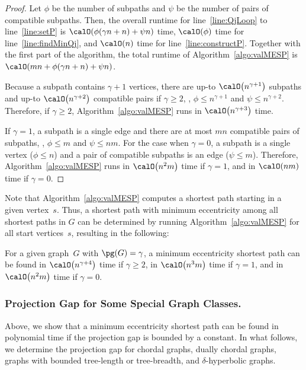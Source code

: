 \begin{proof}
Let $\phi$ be the number of subpaths and $\psi$ be the number of pairs of compatible subpaths.
Then, the overall runtime for line~\ref{line:QjLoop} to line~\ref{line:setP} is $\calO(\phi (\gamma n + n) + \psi n)$ time, $\calO(\phi)$ time for line~\ref{line:findMinQj}, and $\calO(n)$ time for line~\ref{line:constructP}.
Together with the first part of the algorithm, the total runtime of Algorithm~\ref{algo:valMESP} is $\calO(mn + \phi (\gamma n + n) + \psi n)$.

Because a subpath contains $\gamma + 1$ vertices, there are up-to $\calO \big( n^{\gamma + 1} \big)$ subpaths and up-to $\calO \big( n^{\gamma + 2} \big)$ compatible pairs if $\gamma \geq 2$, \ie, $\phi \leq n^{\gamma + 1}$ and $\psi \leq n^{\gamma + 2}$.
Therefore, if $\gamma \geq 2$, Algorithm~\ref{algo:valMESP} runs in $\calO \big( n^{\gamma+3} \big)$ time.

If $\gamma = 1$, a subpath is a single edge and there are at most $mn$ compatible pairs of subpaths, \ie, $\phi \leq m$ and $\psi \leq nm$.
For the case when $\gamma = 0$, a subpath is a single vertex ($\phi \leq n$) and a pair of compatible subpaths is an edge ($\psi \leq m$).
Therefore, Algorithm~\ref{algo:valMESP} runs in $\calO \big( n^2m \big)$ time if $\gamma = 1$, and in $\calO(nm)$ time if $\gamma = 0$.
\end{proof}

Note that Algorithm~\ref{algo:valMESP} computes a shortest path starting in a given vertex~$s$.
Thus, a shortest path with minimum eccentricity among all shortest paths in $G$ can be determined by running Algorithm~\ref{algo:valMESP} for all start vertices~$s$, resulting in the following:

\begin{theorem}
For a given graph~\( G \) with \( \pg(G) = \gamma \), a  minimum eccentricity shortest path can be found in \( \calO \big( n^{\gamma + 4}  \big) \) time if \( \gamma \geq 2 \), in \( \calO \big( n^3 m \big) \) time if \( \gamma = 1 \), and in \( \calO \big( n^2 m \big) \) time if \( \gamma = 0 \).
\end{theorem}

\subsubsection{Projection Gap for Some Special Graph Classes.}

Above, we show that a minimum eccentricity shortest path can be found in polynomial time if the projection gap is bounded by a constant.
In what follows, we determine the projection gap for chordal graphs, dually chordal graphs, graphs with bounded tree-length or tree-breadth, and $\delta$-hyperbolic graphs.

